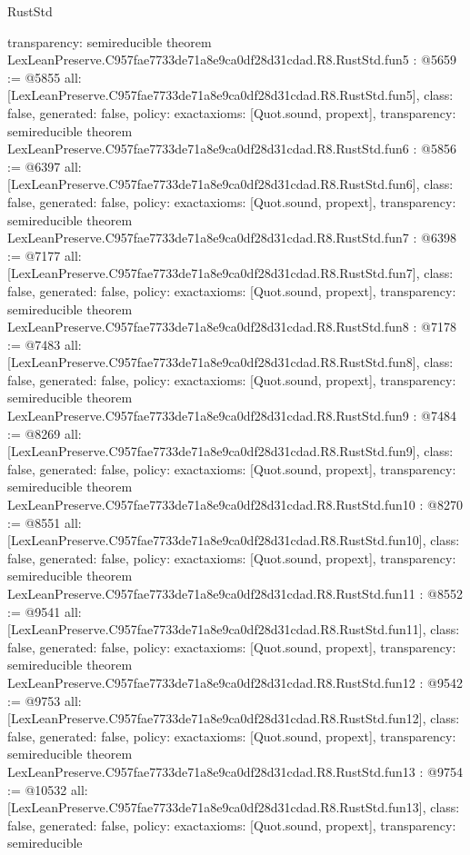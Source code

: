\begin{lexlean}{RustStd}
\begin{coremodule}
{  transparency: semireducible
}
theorem LexLeanPreserve.C957fae7733de71a8e9ca0df28d31cdad.R8.RustStd.fun5 : @5659 := @5855 {
  all: [LexLeanPreserve.C957fae7733de71a8e9ca0df28d31cdad.R8.RustStd.fun5],
  class: false,
  generated: false,
  policy: exact{axioms: [Quot.sound, propext]},
  transparency: semireducible
}
theorem LexLeanPreserve.C957fae7733de71a8e9ca0df28d31cdad.R8.RustStd.fun6 : @5856 := @6397 {
  all: [LexLeanPreserve.C957fae7733de71a8e9ca0df28d31cdad.R8.RustStd.fun6],
  class: false,
  generated: false,
  policy: exact{axioms: [Quot.sound, propext]},
  transparency: semireducible
}
theorem LexLeanPreserve.C957fae7733de71a8e9ca0df28d31cdad.R8.RustStd.fun7 : @6398 := @7177 {
  all: [LexLeanPreserve.C957fae7733de71a8e9ca0df28d31cdad.R8.RustStd.fun7],
  class: false,
  generated: false,
  policy: exact{axioms: [Quot.sound, propext]},
  transparency: semireducible
}
theorem LexLeanPreserve.C957fae7733de71a8e9ca0df28d31cdad.R8.RustStd.fun8 : @7178 := @7483 {
  all: [LexLeanPreserve.C957fae7733de71a8e9ca0df28d31cdad.R8.RustStd.fun8],
  class: false,
  generated: false,
  policy: exact{axioms: [Quot.sound, propext]},
  transparency: semireducible
}
theorem LexLeanPreserve.C957fae7733de71a8e9ca0df28d31cdad.R8.RustStd.fun9 : @7484 := @8269 {
  all: [LexLeanPreserve.C957fae7733de71a8e9ca0df28d31cdad.R8.RustStd.fun9],
  class: false,
  generated: false,
  policy: exact{axioms: [Quot.sound, propext]},
  transparency: semireducible
}
theorem LexLeanPreserve.C957fae7733de71a8e9ca0df28d31cdad.R8.RustStd.fun10 : @8270 := @8551 {
  all: [LexLeanPreserve.C957fae7733de71a8e9ca0df28d31cdad.R8.RustStd.fun10],
  class: false,
  generated: false,
  policy: exact{axioms: [Quot.sound, propext]},
  transparency: semireducible
}
theorem LexLeanPreserve.C957fae7733de71a8e9ca0df28d31cdad.R8.RustStd.fun11 : @8552 := @9541 {
  all: [LexLeanPreserve.C957fae7733de71a8e9ca0df28d31cdad.R8.RustStd.fun11],
  class: false,
  generated: false,
  policy: exact{axioms: [Quot.sound, propext]},
  transparency: semireducible
}
theorem LexLeanPreserve.C957fae7733de71a8e9ca0df28d31cdad.R8.RustStd.fun12 : @9542 := @9753 {
  all: [LexLeanPreserve.C957fae7733de71a8e9ca0df28d31cdad.R8.RustStd.fun12],
  class: false,
  generated: false,
  policy: exact{axioms: [Quot.sound, propext]},
  transparency: semireducible
}
theorem LexLeanPreserve.C957fae7733de71a8e9ca0df28d31cdad.R8.RustStd.fun13 : @9754 := @10532 {
  all: [LexLeanPreserve.C957fae7733de71a8e9ca0df28d31cdad.R8.RustStd.fun13],
  class: false,
  generated: false,
  policy: exact{axioms: [Quot.sound, propext]},
  transparency: semireducible
}
\end{coremodule}
\end{lexlean}

